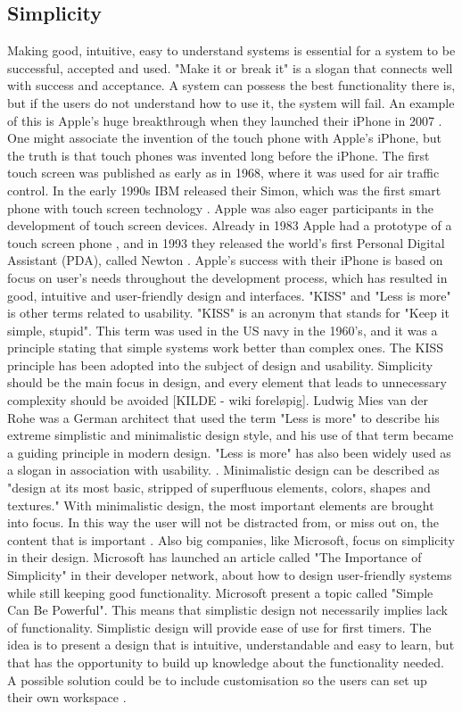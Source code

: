 \subsection{Simplicity}
Making good, intuitive, easy to understand systems is essential for a system to be successful, accepted and used. "Make it or break it" is a slogan that connects well with success and acceptance. A system can possess the best functionality there is, but if the users do not understand how to use it, the system will fail. An example of this is Apple's huge breakthrough when they launched their iPhone in 2007 \cite{iphone2007}. One might associate the invention of the touch phone with Apple's iPhone, but the truth is that touch phones was invented long before the iPhone. The first touch screen was published as early as in 1968, where it was used for air traffic control. In the early 1990s IBM released their Simon, which was the first smart phone with touch screen technology \cite{touchphone}. Apple was also eager participants in the development of touch screen devices. Already in 1983 Apple had a prototype of a touch screen phone \cite{applefirst1983}, and in 1993 they released the world's first Personal Digital Assistant (PDA), called Newton \cite{touchphone}. Apple’s success with their iPhone is based on focus on user’s needs throughout the development process, which has resulted in good, intuitive and user-friendly design and interfaces. "KISS" and "Less is more" is other terms related to usability. "KISS" is an acronym that stands for "Keep it simple, stupid". This term was used in the US navy in the 1960's, and it was a principle stating that simple systems work better than complex ones. The KISS principle has been adopted into the subject of design and usability. Simplicity should be the main focus in design, and every element that leads to unnecessary complexity should be avoided [KILDE - wiki foreløpig]. Ludwig Mies van der Rohe was a German architect that used the term "Less is more" to describe his extreme simplistic and minimalistic design style, and his use of that term became a guiding principle in modern design. "Less is more" has also been widely used as a slogan in association with usability. \cite{rohe}. Minimalistic design can be described as "design at its most basic, stripped of superfluous elements, colors, shapes and textures." With minimalistic design, the most important elements are brought into focus. In this way the user will not be distracted from, or miss out on, the content that is important \cite{lessismore}. Also big companies, like Microsoft, focus on simplicity in their design. Microsoft has launched an article called "The Importance of Simplicity" in their developer network, about how to design user-friendly systems while still keeping good functionality. Microsoft present a topic called "Simple Can Be Powerful". This means that simplistic design not necessarily implies lack of functionality. Simplistic design will provide ease of use for first timers. The idea is to present a design that is intuitive, understandable and easy to learn, but that has the opportunity to build up knowledge about the functionality needed. A possible solution could be to include customisation so the users can set up their own workspace \cite{msdnsimple}.             

